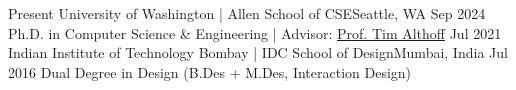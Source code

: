 \begin{educations}
  \education
    {Present}   {University of Washington | Allen School of CSE}{Seattle, WA}{}
    {Sep 2024} {Ph.D. in Computer Science \& Engineering | Advisor: \href{https://homes.cs.washington.edu/~althoff/}{Prof. Tim Althoff}}
  \emptySeparator
  \education
    {Jul 2021}   {Indian Institute of Technology Bombay | IDC School of Design}{Mumbai, India}{}
    {Jul 2016} {Dual Degree in Design (B.Des + M.Des, Interaction Design)}
\end{educations}
